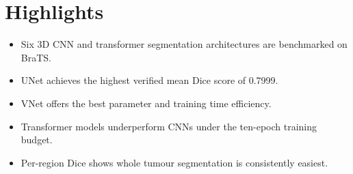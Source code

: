 \documentclass[12pt]{article}
\begin{document}
\section*{Highlights}

\begin{itemize}
\item Six 3D CNN and transformer segmentation architectures are benchmarked on BraTS.
\item UNet achieves the highest verified mean Dice score of 0.7999.
\item VNet offers the best parameter and training time efficiency.
\item Transformer models underperform CNNs under the ten-epoch training budget.
\item Per-region Dice shows whole tumour segmentation is consistently easiest.
\end{itemize}
\end{document}
